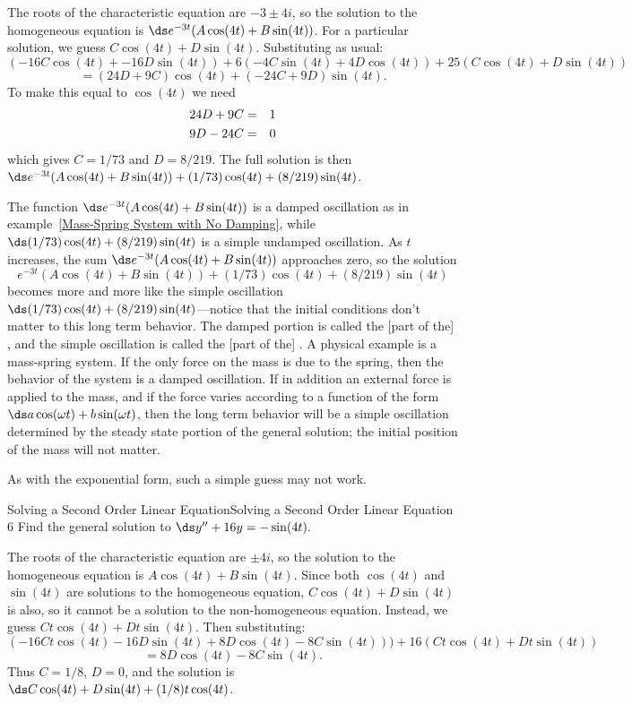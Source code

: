 \begin{solution}
The roots of the characteristic equation are
$-3\pm 4i$, so the solution to the homogeneous equation is
$\ds e^{-3t}(A\cos(4t)+B\sin(4t))$. For a particular solution, we
guess $C\cos(4t)+D\sin(4t)$. Substituting as usual:
$$(-16C\cos(4t)+-16D\sin(4t))+6(-4C\sin(4t)+4D\cos(4t))+25(C\cos(4t)+D\sin(4t))$$
$$=(24D+9C)\cos(4t)+(-24C+9D)\sin(4t).$$
To make this equal to $\cos(4t)$ we need
\begin{eqnarray*}
24D+9C&=&1\cr
9D-24C&=&0
\end{eqnarray*}
which gives $C=1/73$ and $D=8/219$. The full solution is then
$\ds e^{-3t}(A\cos(4t)+B\sin(4t))+(1/73)\cos(4t)+(8/219)\sin(4t)$.

The function $\ds e^{-3t}(A\cos(4t)+B\sin(4t))$ is a damped
oscillation as in example~\ref{Mass-Spring System with No Damping},
while $\ds(1/73)\cos(4t)+(8/219)\sin(4t)$ is a simple undamped
oscillation. As $t$ increases, the sum $\ds
e^{-3t}(A\cos(4t)+B\sin(4t))$ approaches zero, so the solution
$$e^{-3t}(A\cos(4t)+B\sin(4t))+(1/73)\cos(4t)+(8/219)\sin(4t)$$
becomes more and more like the simple oscillation
$\ds(1/73)\cos(4t)+(8/219)\sin(4t)$---notice that the initial
conditions don't matter to this long term behavior. The damped portion
is called the 
 [part of the]
, and the simple oscillation is called the 
 [part of the] . 
A physical example is a mass-spring system. If the only force on the
mass is due to the spring, then the behavior of the system is a damped
oscillation. If in addition an external force is applied to the mass,
and if the force varies according to a function of the form
 $\ds a\cos(\omega t)+b\sin(\omega t)$, then the long term behavior
will be a simple oscillation determined by the steady state portion of the
general solution; the initial position of the mass will not matter.
\end{solution}

As with the exponential form, such a simple guess may not work.

\begin{example}{Solving a Second Order Linear Equation}{Solving a Second Order Linear Equation 6}\label{Solving a Second Order Linear Equation 6}
 Find the general solution to $\ds y''+16y=-\sin(4t).$
\end{example}

\begin{solution}
The roots of the characteristic equation are $\pm4i$, so the
solution to the homogeneous equation is $A\cos(4t)+B\sin(4t)$. Since
both $\cos(4t)$ and $\sin(4t)$ are solutions to the homogeneous
equation,  $C\cos(4t)+D\sin(4t)$ is also, so it cannot be a solution
to the non-homogeneous equation. Instead, we guess
$Ct\cos(4t)+Dt\sin(4t)$. Then substituting:
$$(-16Ct\cos(4t)-16D\sin(4t)+8D\cos(4t)-8C\sin(4t)))+16(Ct\cos(4t)+Dt\sin(4t))$$
$$=8D\cos(4t)-8C\sin(4t).$$
Thus $C=1/8$, $D=0$, and the solution is
$\ds C\cos(4t)+D\sin(4t)+(1/8)t\cos(4t)$.
\end{solution}

